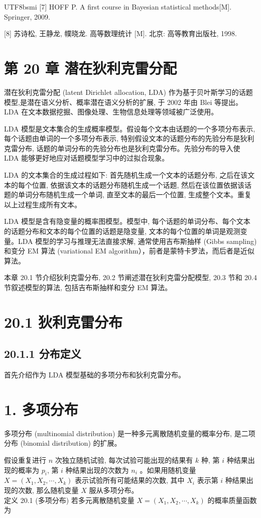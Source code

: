 \documentclass[10pt]{article}
\begin{document}
\begin{CJK*}{UTF8}{bsmi}
[7] HOFF P. A first course in Bayesian statistical methods[M]. Springer, 2009.

[8] 苏诗松, 王静龙, 幞晓龙. 高等数理统计 [M]. 北京: 高等教育出版社, 1998.

\section*{第 20 章 潜在狄利克雷分配}
潜在狄利克雷分配 (latent Dirichlet allocation, LDA) 作为基于贝叶斯学习的话题模型,是潜在语义分析、概率潜在语义分析的扩展, 于 2002 年由 Blei 等提出。LDA 在文本数据挖掘、图像处理、生物信息处理等领域被广泛使用。

LDA 模型是文本集合的生成概率模型。假设每个文本由话题的一个多项分布表示, 每个话题由单词的一个多项分布表示, 特别假设文本的话题分布的先验分布是狄利克雷分布, 话题的单词分布的先验分布也是狄利克雷分布。先验分布的导入使 LDA 能够更好地应对话题模型学习中的过拟合现象。

LDA 的文本集合的生成过程如下: 首先随机生成一个文本的话题分布, 之后在该文本的每个位置, 依据该文本的话题分布随机生成一个话题, 然后在该位置依据该话题的单词分布随机生成一个单词, 直至文本的最后一个位置, 生成整个文本。重复以上过程生成所有文本。

LDA 模型是含有隐变量的概率图模型。模型中, 每个话题的单词分布、每个文本的话题分布和文本的每个位置的话题是隐变量, 文本的每个位置的单词是观测变量。LDA 模型的学习与推理无法直接求解, 通常使用吉布斯抽样 (Gibbs sampling) 和变分 EM 算法 (variational EM algorithm），前者是蒙特卡罗法，而后者是近似算法。

本章 20.1 节介绍狄利克雷分布, 20.2 节阐述潜在狄利克雷分配模型, 20.3 节和 20.4 节叙述模型的算法, 包括吉布斯抽样和变分 EM 算法。

\section*{20.1 狄利克雷分布}
\subsection*{20.1.1 分布定义}
首先介绍作为 LDA 模型基础的多项分布和狄利克雷分布。

\section*{1. 多项分布}
多项分布 (multinomial distribution) 是一种多元离散随机变量的概率分布, 是二项分布 (binomial distribution) 的扩展。

假设重复进行 $n$ 次独立随机试验, 每次试验可能出现的结果有 $k$ 种, 第 $i$ 种结果出现的概率为 $p_{i}$, 第 $i$ 种结果出现的次数为 $n_{i}$ 。如果用随机变量 $X=\left(X_{1}, X_{2}, \cdots, X_{k}\right)$ 表示试验所有可能结果的次数, 其中 $X_{i}$ 表示第 $i$ 种结果出现的次数, 那么随机变量 $X$ 服从多项分布。\\
定义 20.1 (多项分布) 若多元离散随机变量 $X=\left(X_{1}, X_{2}, \cdots, X_{k}\right)$ 的概率质量函数为



\end{CJK*}
\end{document}
